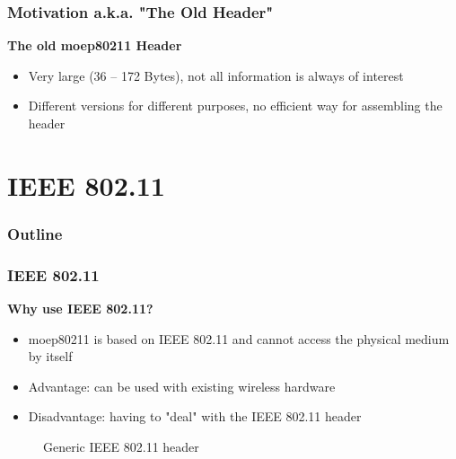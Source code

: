 \documentclass[t]{beamer}
\begin{document}
\begin{frame}
    \frametitle{Motivation a.k.a. "The Old Header"}
    \textbf{The old moep80211 Header}
    
    \begin{figure}
        
    \end{figure}

    \begin{itemize}
        \item<2-> Very large (36 -- 172 Bytes), not all information is always of interest
        \item<3-> Different versions for different purposes, no efficient way for assembling the header
    \end{itemize}
\end{frame}


\section{IEEE 802.11}

\begin{frame}
    \frametitle{Outline}
    \tableofcontents[currentsection]
\end{frame}

\begin{frame}
    \frametitle{IEEE 802.11}
    \textbf{Why use IEEE 802.11?}

	\begin{itemize}
        \item moep80211 is based on IEEE 802.11 and cannot access the physical medium by itself \pause
        \item Advantage: can be used with existing wireless hardware \pause
        \item Disadvantage: having to "deal" with the IEEE 802.11 header
    \end{itemize}

	\pause

	\begin{figure}
		\centering
		
		\caption{Generic IEEE 802.11 header}
	\end{figure}
    

\end{frame}
\end{document}
